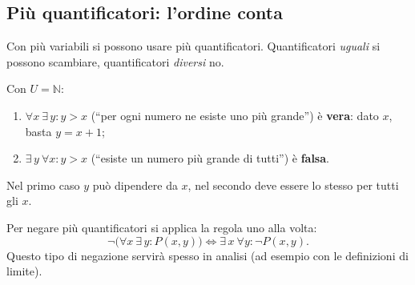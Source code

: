 \documentclass[11pt,a4paper]{article}
\begin{document}
\subsection{Più quantificatori: l'ordine conta}

Con più variabili si possono usare più quantificatori. Quantificatori
\emph{uguali} si possono scambiare, quantificatori \emph{diversi} no.

\begin{esempio}
Con $U = \mathbb{N}$:
\begin{enumerate}
    \item $\forall x\ \exists\, y : y > x$ \quad (``per ogni numero ne
          esiste uno più grande'') è \textbf{vera}: dato $x$, basta
          $y = x + 1$;
    \item $\exists\, y\ \forall x : y > x$ \quad (``esiste un numero più
          grande di tutti'') è \textbf{falsa}.
\end{enumerate}
Nel primo caso $y$ può dipendere da $x$, nel secondo deve essere lo stesso
per tutti gli $x$.
\end{esempio}

Per negare più quantificatori si applica la regola uno alla volta:
\[
\neg\big(\forall x\ \exists\, y : P(x,y)\big) \iff
\exists\, x\ \forall y : \neg P(x,y).
\]
Questo tipo di negazione servirà spesso in analisi (ad esempio con le
definizioni di limite).
\end{document}
